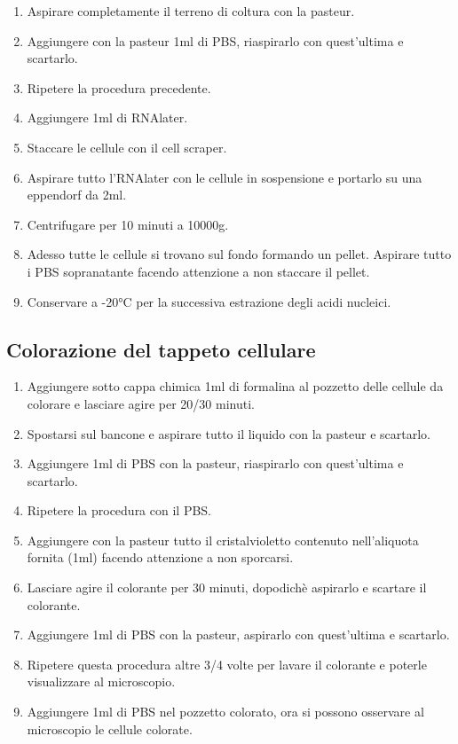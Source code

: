\begin{enumerate}
    \item Aspirare completamente il terreno di coltura con la pasteur.
    \item Aggiungere con la pasteur 1ml di PBS, riaspirarlo con quest'ultima e scartarlo.
    \item Ripetere la procedura precedente.
    \item Aggiungere 1ml di RNAlater.
    \item Staccare le cellule con il cell scraper.
    \item Aspirare tutto l'RNAlater con le cellule in sospensione e portarlo su una
    eppendorf da 2ml.
    \item Centrifugare per 10 minuti a 10000g.
    \item Adesso tutte le cellule si trovano sul fondo formando un pellet. Aspirare tutto
    i PBS sopranatante facendo attenzione a non staccare il pellet.
    \item Conservare a -20°C per la successiva estrazione degli acidi nucleici.
\end{enumerate}

\subsection{Colorazione del tappeto cellulare}

\begin{enumerate}
    \item Aggiungere sotto cappa chimica 1ml di formalina al pozzetto delle cellule da
    colorare e lasciare agire per 20/30 minuti.
    \item Spostarsi sul bancone e aspirare tutto il liquido con la pasteur e scartarlo.
    \item Aggiungere 1ml di PBS con la pasteur, riaspirarlo con quest'ultima e scartarlo.
    \item Ripetere la procedura con il PBS.
    \item Aggiungere con la pasteur tutto il cristalvioletto contenuto nell'aliquota fornita
    (1ml) facendo attenzione a non sporcarsi.
    \item Lasciare agire il colorante per 30 minuti, dopodich\`e aspirarlo e scartare il colorante.
    \item Aggiungere 1ml di PBS con la pasteur, aspirarlo con quest'ultima e scartarlo.
    \item Ripetere questa procedura altre 3/4 volte per lavare il colorante e poterle visualizzare
    al microscopio.
    \item Aggiungere 1ml di PBS nel pozzetto colorato, ora si possono osservare al
    microscopio le cellule colorate.
\end{enumerate}

